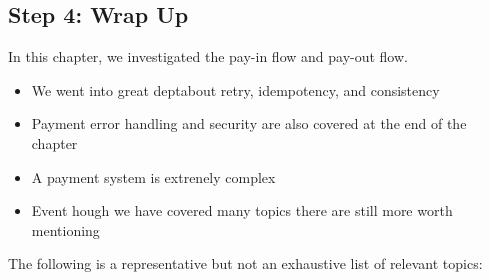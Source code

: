 \documentclass{report}
\theoremstyle{definition}
\let\oldsubsection\subsection
\renewcommand{\subsection}{\oldsubsection*}
\begin{document}
\subsection{Step 4: Wrap Up}

In this chapter, we investigated the pay-in flow and pay-out flow.

\begin{itemize}
\item
We went into great deptabout retry, idempotency, and consistency
\item
Payment error handling and security are also covered at the end of the chapter
\item
A payment system is extrenely complex
\item
Event hough we have covered many topics there are still more worth mentioning
\end{itemize}

The following is a representative but not an exhaustive list of relevant topics:
\end{document}
